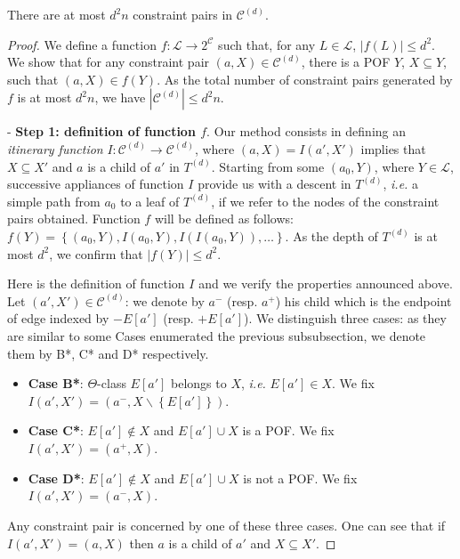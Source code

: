 \documentclass[a4paper,UKenglish,numberwithinsect,cleveref, autoref]{lipics-v2021}
\newcommand{\set}[1]{\left\{ #1 \right\}}
\newcommand{\card}[1]{\left| #1 \right|}
\begin{document}
\begin{theorem}
There are at most $d^2n$ constraint pairs in $\mathcal{C}^{(d)}$.
\label{th:cardinality_c}
\end{theorem}
\begin{proof}
We define a function $f : \mathcal{L} \rightarrow 2^{\mathcal{C}}$ such that, for any $L \in \mathcal{L}$, $\card{f(L)} \le d^2$. We show that for any constraint pair $(a,X) \in \mathcal{C}^{(d)}$, there is a POF $Y$, $X \subseteq Y$, such that $(a,X) \in f(Y)$. As the total number of constraint pairs generated by $f$ is at most $d^2n$, we have $\card{\mathcal{C}^{(d)}} \le d^2n$.

- \textbf{Step 1: definition of function $f$}. Our method consists in defining an \textit{itinerary function} $I : \mathcal{C}^{(d)} \rightarrow \mathcal{C}^{(d)}$, where $(a,X) = I(a',X')$ implies that $X \subseteq X'$ and $a$ is a child of $a'$ in $T^{(d)}$. Starting from some $(a_0,Y)$, where $Y \in \mathcal{L}$, successive appliances of function $I$ provide us with a descent in $T^{(d)}$, {\em i.e.} a simple path from $a_0$ to a leaf of $T^{(d)}$, if we refer to the nodes of the constraint pairs obtained. Function $f$ will be defined as follows: $f(Y) = \set{(a_0,Y),I(a_0,Y),I(I(a_0,Y)),\ldots}$. As the depth of $T^{(d)}$ is at most $d^2$, we confirm that $\card{f(Y)}\le d^2$.

Here is the definition of function $I$ and we verify the properties announced above. Let $(a',X') \in \mathcal{C}^{(d)}$: we denote by $a^-$ (resp. $a^+$) his child which is the endpoint of edge indexed by $-E\left[a'\right]$ (resp. $+E\left[a'\right]$). We distinguish three cases: as they are similar to some Cases enumerated the previous subsubsection, we denote them by B*, C* and D* respectively.
\begin{itemize}
\item \textbf{Case B*}: $\Theta$-class $E\left[a'\right]$ belongs to $X$, {\em i.e.} $E\left[a'\right] \in X$. We fix $I(a',X') = (a^-,X\backslash \set{E\left[a'\right]})$.
\item \textbf{Case C*}: $E\left[a'\right] \notin X$ and $E\left[a'\right] \cup X$ is a POF. We fix $I(a',X') = (a^+,X)$.
\item \textbf{Case D*}: $E\left[a'\right] \notin X$ and $E\left[a'\right] \cup X$ is not a POF. We fix $I(a',X') = (a^-,X)$.
\end{itemize}
Any constraint pair is concerned by one of these three cases. One can see that if $I(a',X') = (a,X)$ then $a$ is a child of $a'$ and $X \subseteq X'$.


\end{proof}
\end{document}

